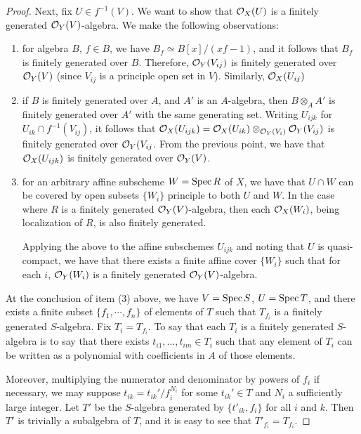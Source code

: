 \begin{proof}
Next, fix $U \in f^{-1}(V)$. We want to show that $\mathcal{O}_X(U)$ is a
finitely generated $\mathcal{O}_Y(V)$-algebra. We make the following 
observations:
\begin{enumerate}
\item for algebra $B$, $f \in B$, we have $B_f \simeq B[x]/(xf - 
1)$, and it follows that $B_f$ is finitely generated over $B$. 
Therefore, $\mathcal{O}_Y(V_{ij})$ is finitely generated over $\mathcal{O}_Y(V)$
(since $V_{ij}$ is a principle open set in $V$). Similarly,
$\mathcal{O}_X(U_{ij})$

\item if $B$ is finitely generated over $A$, and $A'$ is an 
$A$-algebra, then $B \otimes_A A'$ is finitely generated over
$A'$ with the same generating set. Writing $U_{ijk}$ for $U_{ik} 
\cap f^{-1}(V_{ij})$, it follows that $\mathcal{O}_X(U_{ijk}) = \mathcal{O}_X(U_{ik})
\otimes_{\mathcal{O}_Y(V_i)} \mathcal{O}_Y(V_{ij})$ is finitely generated over
$\mathcal{O}_Y(V_{ij}$. From the previous point, we have that
$\mathcal{O}_X(U_{ijk})$ is finitely generated over $\mathcal{O}_Y(V)$.

\item for an arbitrary affine subscheme $W = \mathrm{Spec}\, R$ of $X$, we 
have that $U \cap W$ can be covered by open subsets $\{W_i\}$ 
principle to both $U$ and $W$. In the case where $R$ is a finitely
generated $\mathcal{O}_Y(V)$-algebra, then each $\mathcal{O}_X(W_i)$, being 
localization of $R$, is also finitely generated. 

Applying the above to the affine subschemes $U_{ijk}$ and noting
that $U$ is quasi-compact, we have that there exists a finite
affine cover $\{W_i\}$ such that for each $i$, $\mathcal{O}_Y(W_i)$ is a
finitely generated $\mathcal{O}_Y(V)$-algebra.
\end{enumerate}

At the conclusion of item (3) above, we have $V = \mathrm{Spec}\, S$,
$U = \mathrm{Spec}\, T$, and there exists a finite subset $\{f_1,
\cdots, f_n\}$ of elements of $T$ such that $T_{f_i}$ is a
finitely generated $S$-algebra. Fix $T_i = T_{f_i}$. To say
that each $T_i$ is a finitely generated $S$-algebra is to say that
there exists $t_{i1},\dots,t_{im} \in T_i$ such that any element 
of $T_i$ can be written as a polynomial with coefficients in $A$ 
of those elements. 

Moreover, multiplying the numerator and denominator by powers of 
$f_i$ if necessary, we may suppose $t_{ik} = t_{ik}'/f_i^{N_i}$ for 
some $t_{ik}' \in T$ and $N_i$ a sufficiently large integer. Let
$T'$ be the $S$-algebra generated by $\{t'_{ik}, f_i\}$ for all 
$i$ and $k$. Then $T'$ is trivially a subalgebra of $T$, and it is 
easy to see that $T'_{f_i} = T_{f_i}$.


\end{proof}
